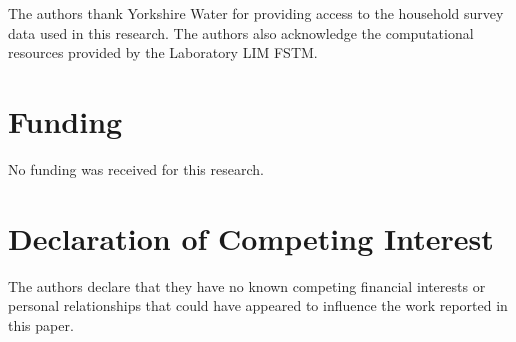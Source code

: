 \documentclass[a4paper,12pt]{article}
\begin{document}
The authors thank Yorkshire Water for providing access to the household survey data used in this research. The authors also acknowledge the computational resources provided by the Laboratory LIM FSTM.

\vspace{0.5cm}

\section*{Funding}

No funding was received for this research.

\vspace{0.5cm}

\section*{Declaration of Competing Interest}

The authors declare that they have no known competing financial interests or personal relationships that could have appeared to influence the work reported in this paper.
\end{document}
